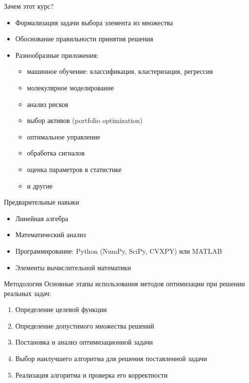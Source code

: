 \documentclass[12pt]{beamer}
\begin{document}
\begin{frame}{Зачем этот курс?}
\begin{itemize}[<+->]
\item Формализация задачи выбора элемента из множества
\item Обоснование правильности принятия решения
\item Разнообразные приложения:
\begin{itemize}
\item машинное обучение: классификация, кластеризация, регрессия
\item молекулярное моделирование
\item анализ рисков
\item выбор активов (portfolio optimization)
\item оптимальное управление
\item обработка сигналов
\item оценка параметров в статистике 
\item и другие%
\end{itemize}
\end{itemize}
\end{frame}

\begin{frame}{Предварительные навыки}
\begin{itemize}
\item Линейная алгебра
\item Математический анализ
\item Программирование: Python (NumPy, SciPy, CVXPY) или MATLAB
\item Элементы вычислительной математики
\end{itemize}
\end{frame}

\begin{frame}{Методология}
Основные этапы использования методов оптимизации при решении реальных задач:
\begin{enumerate}[<+->]
\item Определение целевой функции
\item Определение допустимого множества решений
\item Постановка и анализ оптимизационной задачи
\item Выбор наилучшего алгоритма для решения поставленной задачи
\item Реализация алгоритма и проверка его корректности
\end{enumerate}

\end{frame}
\end{document}
